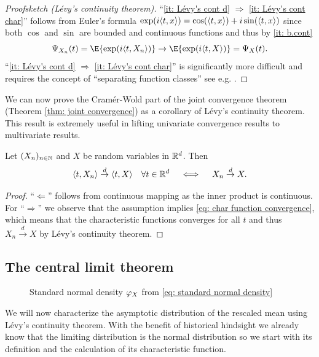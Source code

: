 \begin{proof}[Proofsketch (Lévy's continuity theorem)]
    ``\ref{it: Lévy's cont d} \(\Rightarrow\) \ref{it: Lévy's cont char}''
    follows from Euler's formula \(\exp(i\langle t, x\rangle) = \cos(\langle t, x\rangle) + i \sin(\langle t, x\rangle)\) since both \(\cos\) and \(\sin\) 
    are bounded and continuous functions and thus by \ref{it: b.cont}
    \begin{equation}
        \label{eq: char function convergence}    
        \charFct_{X_n}(t)
        = \E{\exp(i\scp{t, X_n})}
        \to \E{\exp(i\scp{t, X})}
        = \charFct_X(t).
    \end{equation}
    ``\ref{it: Lévy's cont d} \(\Rightarrow\) \ref{it: Lévy's cont char}'' is significantly
    more difficult and requires the concept of ``separating function classes''
    see e.g.
    \citep{klenkeProbabilityTheoryComprehensive2014,kallenbergFoundationsModernProbability2002}.
\end{proof}

We can now prove the Cramér-Wold part of the joint convergence theorem (Theorem
\ref{thm: joint convergence}) as a corollary of Lévy's continuity theorem.
This result is extremely useful in lifting univariate convergence results to
multivariate results.

\begin{corollary}
    \label{cor: cramer wold}
    Let \((X_n)_{n\in \mathbb{N}}\) and \(X\) be random variables in \(\mathbb{R}^d\). Then
    \[
        \langle t, X_n\rangle \overset{d}\to \langle t, X\rangle \quad \forall t \in \mathbb{R}^d
        \quad \iff \quad
        X_n \overset{d}\to X.
    \]
\end{corollary}
\begin{proof}
    ``\(\Leftarrow\)'' follows from continuous mapping as the inner product
    is continuous. For ``\(\Rightarrow\)'' we observe that the assumption
    implies \eqref{eq: char function convergence},
    which means that the characteristic functions converges for all
    \(t\) and thus \(X_n \overset{d}\to X\) by Lévy's continuity theorem.
\end{proof}

\subsection{The central limit theorem}

\begin{figure}
    \vspace{-2em}
    \scalebox{0.7}{
    
    }
    \caption{Standard normal density \(\varphi_X\) from \eqref{eq: standard normal density}}
\end{figure} 
We will now characterize the asymptotic distribution of the rescaled mean using
Lévy's continuity theorem. With the benefit of historical hindsight we already
know that the limiting distribution is the normal distribution so we start
with its definition and the calculation of its characteristic function.

